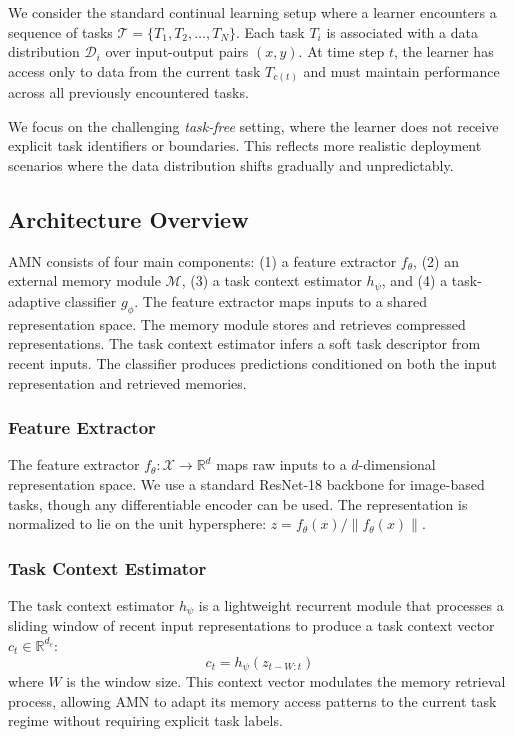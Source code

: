 \documentclass[11pt]{article}
\begin{document}
We consider the standard continual learning setup where a learner encounters a sequence of tasks $\mathcal{T} = \{T_1, T_2, \ldots, T_N\}$. Each task $T_i$ is associated with a data distribution $\mathcal{D}_i$ over input-output pairs $(x, y)$. At time step $t$, the learner has access only to data from the current task $T_{c(t)}$ and must maintain performance across all previously encountered tasks.

We focus on the challenging \emph{task-free} setting, where the learner does not receive explicit task identifiers or boundaries. This reflects more realistic deployment scenarios where the data distribution shifts gradually and unpredictably.

\subsection{Architecture Overview}

AMN consists of four main components: (1) a feature extractor $f_\theta$, (2) an external memory module $\mathcal{M}$, (3) a task context estimator $h_\psi$, and (4) a task-adaptive classifier $g_\phi$. The feature extractor maps inputs to a shared representation space. The memory module stores and retrieves compressed representations. The task context estimator infers a soft task descriptor from recent inputs. The classifier produces predictions conditioned on both the input representation and retrieved memories.

\subsubsection{Feature Extractor}

The feature extractor $f_\theta: \mathcal{X} \rightarrow \mathbb{R}^d$ maps raw inputs to a $d$-dimensional representation space. We use a standard ResNet-18 backbone \citep{he2016deep} for image-based tasks, though any differentiable encoder can be used. The representation is normalized to lie on the unit hypersphere: $z = f_\theta(x) / \|f_\theta(x)\|$.


\subsubsection{Task Context Estimator}

The task context estimator $h_\psi$ is a lightweight recurrent module that processes a sliding window of recent input representations to produce a task context vector $c_t \in \mathbb{R}^{d_c}$:
\begin{equation}
    c_t = h_\psi(z_{t-W:t})
\end{equation}
where $W$ is the window size. This context vector modulates the memory retrieval process, allowing AMN to adapt its memory access patterns to the current task regime without requiring explicit task labels.
\end{document}
